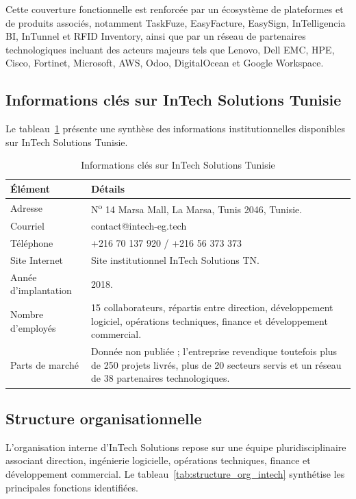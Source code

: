 Cette couverture fonctionnelle est renforcée par un écosystème de plateformes
et de produits associés, notamment TaskFuze, EasyFacture, EasySign,
InTelligencia BI, InTunnel et RFID Inventory, ainsi que par un réseau de
partenaires technologiques incluant des acteurs majeurs tels que Lenovo, Dell
EMC, HPE, Cisco, Fortinet, Microsoft, AWS, Odoo, DigitalOcean et Google
Workspace.

\subsection{Informations clés sur InTech Solutions Tunisie}

Le tableau~\ref{tab:infos_cles_intech} présente une synthèse des informations
institutionnelles disponibles sur InTech Solutions Tunisie.

\begin{table}[H]
\centering
\caption[Informations clés InTech]{Informations clés sur InTech Solutions Tunisie}
\label{tab:infos_cles_intech}
\renewcommand{\arraystretch}{1.25}
\begin{tabular}{p{}p{}}
\toprule
\textbf{Élément} & \textbf{Détails} \\
\midrule
Adresse & N\textsuperscript{o} 14 Marsa Mall, La Marsa, Tunis 2046, Tunisie. \\
Courriel & contact@intech-eg.tech \\
Téléphone & +216 70 137 920 / +216 56 373 373 \\
Site Internet & Site institutionnel InTech Solutions TN. \\
Année d'implantation & 2018. \\
Nombre d'employés & 15 collaborateurs, répartis entre direction, développement logiciel, opérations techniques, finance et développement commercial. \\
Parts de marché & Donnée non publiée ; l'entreprise revendique toutefois plus de 250 projets livrés, plus de 20 secteurs servis et un réseau de 38 partenaires technologiques. \\
\bottomrule
\end{tabular}
\end{table}

\subsection{Structure organisationnelle}

L'organisation interne d'InTech Solutions repose sur une équipe pluridisciplinaire
associant direction, ingénierie logicielle, opérations techniques, finance et
développement commercial. Le tableau~\ref{tab:structure_org_intech} synthétise
les principales fonctions identifiées.


